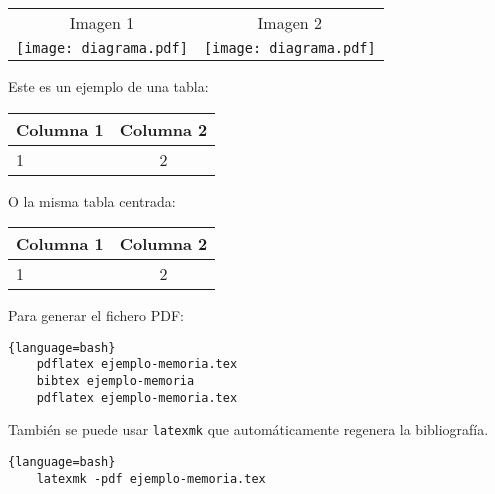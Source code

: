   \begin{tabular}{cc}
    Imagen 1 & Imagen 2 \\[2mm]
    \texttt{[image: diagrama.pdf]} &  \texttt{[image: diagrama.pdf]}
  \end{tabular}

  Este es un ejemplo de una tabla:

  \begin{tabular}{|l|c|}
    \hline
    Columna 1 & Columna 2 \\ \hline
    1 & 2 \\ \hline
  \end{tabular}


  \vspace*{1cm}
  O la misma tabla centrada:

  \begin{center}
    \begin{tabular}{|l|c|}
      \hline
      Columna 1 & Columna 2 \\ \hline
      1 & 2 \\ \hline
    \end{tabular}
  \end{center}

  Para generar el fichero PDF:

  \begin{lstlisting}{language=bash}
    pdflatex ejemplo-memoria.tex
    bibtex ejemplo-memoria
    pdflatex ejemplo-memoria.tex
\end{lstlisting}

  También se puede usar \texttt{latexmk} que automáticamente regenera la bibliografía.
  \begin{lstlisting}{language=bash}
    latexmk -pdf ejemplo-memoria.tex
\end{lstlisting}
